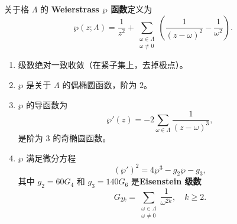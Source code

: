 \begin{definition}[Weierstrass $\wp$ 函数]
\label{def:weierstrass-p}
关于格 $\Lambda$ 的 \textbf{Weierstrass $\wp$ 函数}定义为
\[
  \wp(z; \Lambda) = \frac{1}{z^2}
  + \sum_{\substack{\omega \in \Lambda \\ \omega \neq 0}}
  \left(\frac{1}{(z - \omega)^2} - \frac{1}{\omega^2}\right).
\]
\end{definition}

\begin{theorem}[$\wp$ 函数的性质]
\label{thm:weierstrass-properties}
\leavevmode
\begin{enumerate}
  \item 级数绝对一致收敛（在紧子集上，去掉极点）。
  \item $\wp$ 是关于 $\Lambda$ 的偶椭圆函数，阶为 $2$。
  \item $\wp$ 的导函数为
    \[
      \wp'(z) = -2 \sum_{\omega \in \Lambda} \frac{1}{(z - \omega)^3},
    \]
    是阶为 $3$ 的奇椭圆函数。
  \item $\wp$ 满足微分方程
    \[
      (\wp')^2 = 4\wp^3 - g_2 \wp - g_3,
    \]
    其中 $g_2 = 60 G_4$ 和 $g_3 = 140 G_6$ 是\textbf{Eisenstein 级数}
    \[
      G_{2k} = \sum_{\substack{\omega \in \Lambda \\ \omega \neq 0}}
      \frac{1}{\omega^{2k}}, \quad k \geq 2.
    \]
\end{enumerate}
\end{theorem}

